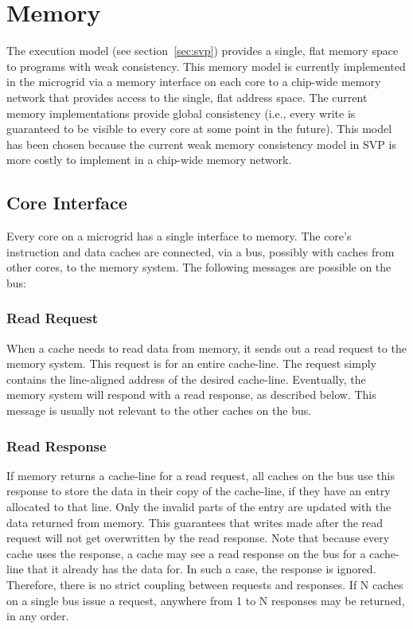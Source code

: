 \chapter{Memory}

The execution model (see section~\ref{sec:svp}) provides a single, flat memory space to programs with weak consistency. This memory model is currently implemented in the microgrid via a memory interface on each core to a chip-wide memory network that provides access to the single, flat address space. The current memory implementations provide global consistency (i.e., every write is guaranteed to be visible to every core at some point in the future). This model has been chosen because the current weak memory consistency model in SVP is more costly to implement in a chip-wide memory network.

\section{Core Interface}
Every core on a microgrid has a single interface to memory. The core's instruction and data caches are connected, via a bus, possibly with caches from other cores, to the memory system. The following messages are possible on the bus:

\subsection{Read Request}
When a cache needs to read data from memory, it sends out a read request to the memory system. This request is for an entire cache-line. The request simply contains the line-aligned address of the desired cache-line. Eventually, the memory system will respond with a read response, as described below. This message is usually not relevant to the other caches on the bus.

\subsection{Read Response}
If memory returns a cache-line for a read request, all caches on the bus use this response to store the data in their copy of the cache-line, if they have an entry allocated to that line. Only the invalid parts of the entry are updated with the data returned from memory. This guarantees that writes made after the read request will not get overwritten by the read response. Note that because every cache uses the response, a cache may see a read response on the bus for a cache-line that it already has the data for. In such a case, the response is ignored. Therefore, there is no strict coupling between requests and responses. If N caches on a single bus issue a request, anywhere from 1 to N responses may be returned, in any order.

